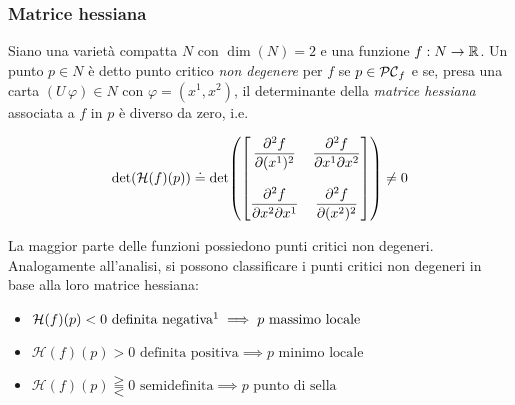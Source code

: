 \subsubsection{Matrice hessiana}

Siano una varietà compatta $ N $ con $ \dim(N) = 2 $ e una funzione $ f : N \to \mathbb{R} $. Un punto $ p \in N $  è detto punto critico \textit{non degenere} per $ f $ se $ p \in \mathcal{PC}_{f} $ e se, presa una carta $ (U\,\varphi) \in N $ con $ \varphi = (x^{1},x^{2}) $, il determinante della \textit{matrice hessiana} associata a $ f $ in $ p $ è diverso da zero, i.e.

\begin{equation}
	\det(\mathcal{H}(f)(p)) \doteq \det( \bmqty{ \dpdv[2]{f}{(x^{1})} & \dpdv[2]{f}{x^{1}}{x^{2}} \\ \\ \dpdv[2]{f}{x^{2}}{x^{1}} & \dpdv[2]{f}{(x^{2})} } ) %
	\neq 0
\end{equation}

La maggior parte delle funzioni possiedono punti critici non degeneri. \\
Analogamente all'analisi, si possono classificare i punti critici non degeneri in base alla loro matrice hessiana:

\begin{itemize}
	\item $ \mathcal{H}(f)(p) < 0 \text{ definita negativa\footnotemark} \implies p \text{ massimo locale} $
	
	\item $ \mathcal{H}(f)(p) > 0 \text{ definita positiva} \implies p \text{ minimo locale} $
	
	\item $ \mathcal{H}(f)(p) \gtreqqless 0 \text{ semidefinita} \implies p \text{ punto di sella} $
\end{itemize}

